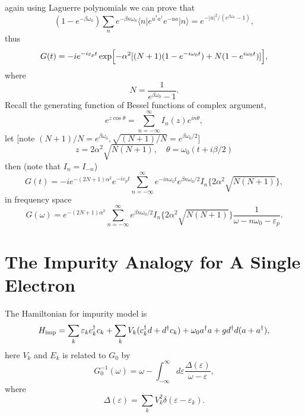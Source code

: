 \documentclass{book}
\newcommand{\bra}[1]{{\langle#1|}}
\newcommand{\ket}[1]{{|#1\rangle}}
\numberwithin{equation}{section}
\begin{document}
again using Laguerre polynomials we can prove that
\begin{equation}
  (1-e^{-\beta\omega_0})\sum_ne^{-\beta n\omega_0}
  \bra{n}e^{u^*a^\dag}e^{-u a}\ket{n}=e^{-|u|^2/(e^{\beta\omega_0}-1)},
\end{equation}
thus
\begin{equation}
  G(t)=-ie^{-i\varepsilon_pt}
    \exp\Bigl[-\alpha^2[(N+1)(1-e^{-i\omega_0t})+N(1-e^{i\omega_0t})]\Bigr],
\end{equation}
where
\begin{equation}
  N=\frac{1}{e^{\beta\omega_0}-1}.
\end{equation}
Recall the generating function of Bessel functions of complex argument,
\begin{equation}
  e^{z\cos\theta}=\sum_{n=-\infty}^\infty I_n(z)e^{in\theta},
\end{equation}
let [note $(N+1)/N=e^{\beta\omega_0},\sqrt{(N+1)/N}=e^{\beta\omega_0/2}$]
\begin{equation}
  z=2\alpha^2\sqrt{N(N+1)},\quad \theta=\omega_0(t+i\beta/2)
\end{equation}
then (note that $I_{n}=I_{-n}$)
\begin{equation}
  G(t)=-ie^{-(2N+1)\alpha^2}e^{-i\varepsilon_pt}\sum_{n=-\infty}^\infty
  e^{-in\omega_0t}e^{\beta n\omega_0/2}I_n\{2\alpha^2\sqrt{N(N+1)}\},
\end{equation}
in frequency space
\begin{equation}
  G(\omega)=e^{-(2N+1)\alpha^2}\sum_{n=-\infty}^{\infty}
  e^{\beta n\omega_0/2}I_n\{2\alpha^2\sqrt{N(N+1)}\}
  \frac{1}{\omega-n\omega_0-\varepsilon_p}.
\end{equation}


\section{The Impurity Analogy for A Single Electron}
The Hamiltonian for impurity model is
\begin{equation}
  H_{\rm imp}=\sum_k\varepsilon_kc_k^\dag c_k+\sum_kV_k(c_k^\dag d+d^\dag c_k)
  +\omega_0a^\dag a+gd^\dag d(a+a^\dag),
\end{equation}
here $V_k$ and $E_k$ is related to $G_0$ by
\begin{equation}
  G_0^{-1}(\omega)=\omega-\int_{-\infty}^\infty d\varepsilon
  \frac{\Delta(\varepsilon)}{\omega-\varepsilon},
\end{equation}
where
\begin{equation}
  \Delta(\varepsilon)=\sum_kV_k^2\delta(\varepsilon-\varepsilon_k).
\end{equation}
\end{document}
